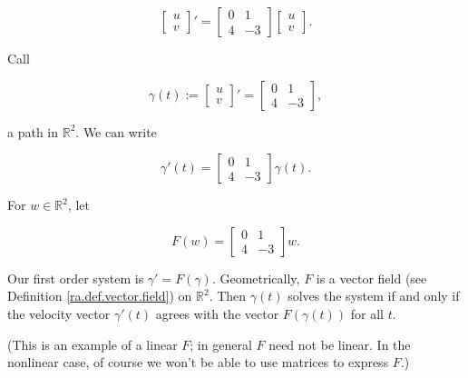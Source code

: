 \begin{example}

\[
\begin{bmatrix}
u \\
v \end{bmatrix}' = \begin{bmatrix}0 & 1 \\
4 & -3
\end{bmatrix} \begin{bmatrix}
u \\
v \end{bmatrix}.
\]

Call

\[
\gamma(t) := \begin{bmatrix}
u \\
v \end{bmatrix}' = \begin{bmatrix}0 & 1 \\
4 & -3
\end{bmatrix} ,
\]

a path in \(\mathbb{R}^2\). We can write

\[
\gamma'(t)= \begin{bmatrix}0 & 1 \\
4 & -3
\end{bmatrix} \gamma(t).
\]

For \(w \in \mathbb{R}^2\), let 

\[
F(w) = \begin{bmatrix}0 & 1 \\
4 & -3
\end{bmatrix} w.
\]

Our first order system is \(\gamma' = F(\gamma)\). Geometrically, \(F\) is a vector field (see Definition \ref{ra.def.vector.field}) on \(\mathbb{R}^2\). Then \(\gamma(t)\) solves the system if and only if the velocity vector \(\gamma'(t) \) agrees with the vector \(F(\gamma(t))\) for all \(t\).

(This is an example of a linear \(F\); in general \(F\) need not be linear. In the nonlinear case, of course we won't be able to use matrices to express \(F\).)


\end{example}

